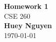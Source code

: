 \begin{titlepage}
    \begin{center}
        {\fontsize{40}{48}\selectfont \bfseries Homework 1}
        \\\vspace{20pt}
        {\LARGE CSE 260} \\
        \vspace{20pt}
        \textbf{Huey Nguyen}
        \vspace{8pt}
        \\\today
    \end{center}
\end{titlepage}